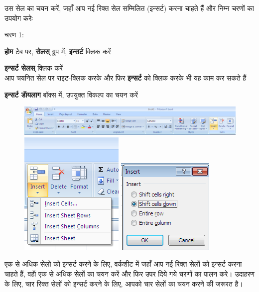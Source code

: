 उस सेल का चयन करें, जहाँ आप नई रिक्त सेल सम्मिलित (इन्सर्ट) करना चाहते हैं और निम्न चरणों का उपयोग करेः
\begin{descriptionSimple}{चरण 1:}
\item[चरण 1] \textbf{होम} टैब पर, \textbf{सेलस्} ग्रुप में, \textbf{इन्सर्ट} क्लिक करें
\item[चरण 2] \textbf{इन्सर्ट सेलस्} क्लिक करें\\  आप चयनित सेल पर राइट-क्लिक करके और फिर \textbf{इन्सर्ट} को क्लिक करके भी यह काम कर सकते हैं
\item[चरण 3] \textbf{इन्सर्ट डॅायलाग} बॉक्स में, उपयुक्त विकल्प का चयन करें
\end{descriptionSimple}
\begin{figure}[H]
\centering
\includegraphics[scale=0.37]{src/images/chapter1/chapter1_fig28.png}\\[4pt]
\includegraphics[scale=0.37]{src/images/chapter1/chapter1_fig29.png}\qquad
\includegraphics[scale=0.37]{src/images/chapter1/chapter1_fig30.png}
\end{figure}

एक से अधिक सेलो को इन्सर्ट करने के लिए, वर्कशीट में जहाँ आप नई रिक्त सेलों को इन्सर्ट करना चाहते हैं, वहॅा एक से अधिक सेलों का चयन करें और फिर उपर दिये गये चरणों का पालन करे। उदाहरण के लिए, चार रिक्त सेलों को इन्सर्ट करने के लिए, आपको चार सेलों का चयन करने की जरूरत है।

